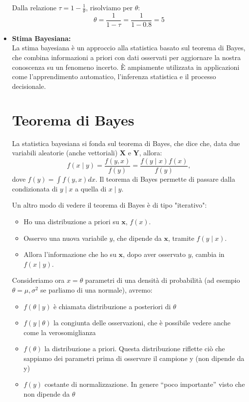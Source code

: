 \documentclass[a4paper,12pt]{article}
\begin{document}
\begin{itemize}
	Dalla relazione \(\tau = 1 - \frac{1}{\theta}\), risolviamo per \(\theta\):
	\[
	\theta = \frac{1}{1 - \tau} = \frac{1}{1 - 0.8} = 5
	\]
	\item \textbf{Stima Bayesiana:}\\
	La stima bayesiana è un approccio alla statistica basato sul teorema di Bayes, che combina informazioni a priori con dati osservati per aggiornare la nostra conoscenza su un fenomeno incerto. È ampiamente utilizzata in applicazioni come l'apprendimento automatico, l'inferenza statistica e il processo decisionale.\\
	\section*{Teorema di Bayes}
	La statistica bayesiana si fonda sul teorema di Bayes, che dice che, data due variabili aleatorie (anche vettoriali) \(\mathbf{X}\) e \(\mathbf{Y}\), allora:
	\[
	f(x \mid y) = \frac{f(y, x)}{f(y)} = \frac{f(y \mid x)f(x)}{f(y)},
	\]
	dove \(f(y) = \int f(y, x) dx\). Il teorema di Bayes permette di passare dalla condizionata di \(y \mid x\) a quella di \(x \mid y\).
	
	Un altro modo di vedere il teorema di Bayes è di tipo "iterativo":
	\begin{itemize}
		\item Ho una distribuzione a priori su \(\mathbf{x}\), \(f(x)\).
		\item Osservo una nuova variabile \(y\), che dipende da \(\mathbf{x}\), tramite \(f(y \mid x)\).
		\item Allora l'informazione che ho su \(\mathbf{x}\), dopo aver osservato \(y\), cambia in \(f(x \mid y)\).
	\end{itemize}
	Consideriamo ora $x=\theta$ parametri di una densità di probabilità (ad esempio $\theta=\mu,\sigma^2 $ se parliamo di una normale), avremo:\\
	\begin{itemize}
		\item $f(\theta \mid y)$ è chiamata distribuzione a posteriori di $\theta$
		\item $f(y \mid \theta)$ la congiunta delle osservazioni, che è possibile vedere anche come la verosomiglianza
		\item $f(\theta)$  la distribuzione a priori. Questa distribuzione riflette ciò che sappiamo dei
		parametri prima di osservare il campione y (non dipende da y)
		\item $f(y)$  costante di normalizzazione. In genere “poco importante” visto che non
		dipende da $\theta$
	\end{itemize}
	

\end{itemize}
\end{document}
